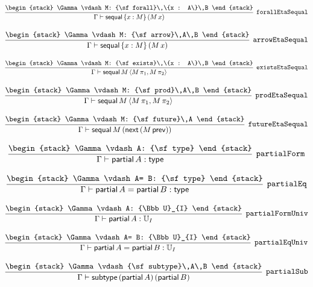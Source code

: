 \[
\infer[{\tt forallEtaSequal}]{\Gamma \vdash {\sf sequal}\,\{x : M\}\,(M\,x)}{
\begin{stack}
\Gamma \vdash M: {\sf forall}\,\{x : A\}\,B
\end{stack}}
\]

\[
\infer[{\tt arrowEtaSequal}]{\Gamma \vdash {\sf sequal}\,\{x : M\}\,(M\,x)}{
\begin{stack}
\Gamma \vdash M: {\sf arrow}\,A\,B
\end{stack}}
\]

\[
\infer[{\tt existsEtaSequal}]{\Gamma \vdash {\sf sequal}\,M\,\langle M\, \pi_1,M\, \pi_2\rangle }{
\begin{stack}
\Gamma \vdash M: {\sf exists}\,\{x : A\}\,B
\end{stack}}
\]

\[
\infer[{\tt prodEtaSequal}]{\Gamma \vdash {\sf sequal}\,M\,\langle M\, \pi_1,M\, \pi_2\rangle }{
\begin{stack}
\Gamma \vdash M: {\sf prod}\,A\,B
\end{stack}}
\]

\[
\infer[{\tt futureEtaSequal}]{\Gamma \vdash {\sf sequal}\,M\,({\sf next}\,(M\, {\sf prev}))}{
\begin{stack}
\Gamma \vdash M: {\sf future}\,A
\end{stack}}
\]

\[
\infer[{\tt partialForm}]{\Gamma \vdash {\sf partial}\,A: {\sf type}}{
\begin{stack}
\Gamma \vdash A: {\sf type}
\end{stack}}
\]

\[
\infer[{\tt partialEq}]{\Gamma \vdash {\sf partial}\,A= {\sf partial}\,B: {\sf type}}{
\begin{stack}
\Gamma \vdash A= B: {\sf type}
\end{stack}}
\]

\[
\infer[{\tt partialFormUniv}]{\Gamma \vdash {\sf partial}\,A: {\Bbb U}_{I}}{
\begin{stack}
\Gamma \vdash A: {\Bbb U}_{I}
\end{stack}}
\]

\[
\infer[{\tt partialEqUniv}]{\Gamma \vdash {\sf partial}\,A= {\sf partial}\,B: {\Bbb U}_{I}}{
\begin{stack}
\Gamma \vdash A= B: {\Bbb U}_{I}
\end{stack}}
\]

\[
\infer[{\tt partialSub}]{\Gamma \vdash {\sf subtype}\,({\sf partial}\,A)\,({\sf partial}\,B)}{
\begin{stack}
\Gamma \vdash {\sf subtype}\,A\,B
\end{stack}}
\]

